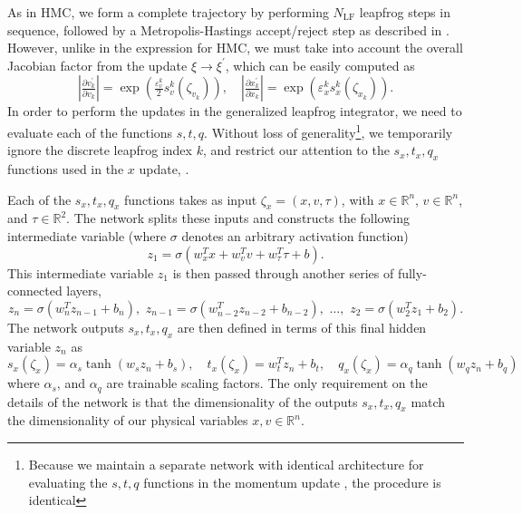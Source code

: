 \documentclass{article} %
\begin{document}
{As in HMC, we form a complete trajectory by performing \(N_{\mathrm{LF}}\) leapfrog steps in sequence, followed by a
Metropolis-Hastings accept/reject step as described in .
%
However, unlike in the expression for HMC, we must take into account the overall Jacobian factor from the update
\(\xi\rightarrow\xi^{\prime}\), which can be easily computed as 
%
\begin{equation}
   \left|\tfrac{\partial v^{\prime}_{k}}{\partial v_{k}}\right| 
   = \exp{\left(\tfrac{\varepsilon^{k}_{v}}{2}s^{k}_{v}(\zeta_{v_{k}})\right)},\quad
   \left|\tfrac{\partial x^{\prime}_{k}}{\partial x_{k}}\right| 
   = \exp{\left(\varepsilon^{k}_{x} s^{k}_{x}(\zeta_{x_{k}})\right)}.
\end{equation}
%
In order to perform the updates in the generalized leapfrog integrator, we need to evaluate each of the functions
\(s, t, q\).
%
%
Without loss of generality\footnote{Because we maintain a separate network with identical architecture for evaluating
the \(s, t, q\) functions in the momentum update , the procedure is identical},
we temporarily ignore the discrete leapfrog index \(k\), and restrict our attention to the
\(s_{x}, t_{x}, q_{x}\) functions used in the \(x\) update, .
%

Each of the \(s_{x}, t_{x}, q_{x}\) functions takes as input \(\zeta_{x} = (x, v, \tau)\), with \(x\in\mathbb{R}^{n}\),
\(v\in\mathbb{R}^{n}\), and \(\tau \in \mathbb{R}^{2}\).
%
The network splits these inputs and constructs the following intermediate variable (where \(\sigma\) denotes an
arbitrary activation function)
%
\begin{equation}
   z_{1} = \sigma(w_{x}^{T}x + w_{v}^{T}v + w_{\tau}^{T}\tau + b).
\end{equation}
%
This intermediate variable \(z_{1}\) is then passed through another series of fully-connected layers,
%
\begin{equation}
   z_{n} = \sigma(w_{n}^{T} z_{n-1} + b_{n}),\,\, z_{n-1}=\sigma(w_{n-2}^{T}z_{n-2} + b_{n-2}),\,\,%
   \ldots,\,\, z_{2} = \sigma(w_{2}^{T} z_{1} + b_{2}).
\end{equation}
%
The network outputs \(s_{x}, t_{x}, q_{x}\) are then defined in terms of this final hidden variable \(z_{n}\) as
%
\begin{equation}
   s_{x}(\zeta_{x}) = \alpha_{s}\tanh(w_{s}z_{n} + b_{s}),\quad
   t_{x}(\zeta_{x}) = w_{t}^{T}z_{n} + b_{t},\quad
   q_{x}(\zeta_{x}) = \alpha_{q}\tanh(w_{q}z_{n} + b_{q})
\end{equation}
%
where \(\alpha_{s}\), and \(\alpha_{q}\) are trainable scaling factors.
%
The only requirement on the details of the network is that the dimensionality of the outputs \(s_{x}, t_{x}, q_{x}\)
match the dimensionality of our physical variables \(x, v \in\mathbb{R}^{n}\).
%

}
\end{document}
